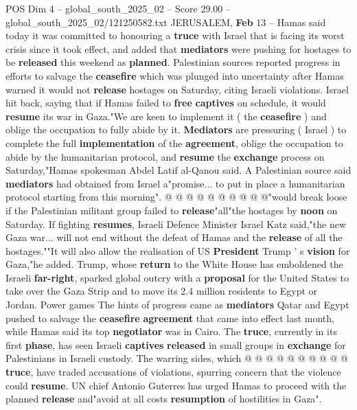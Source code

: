 \begin{textsample}{POS Dim 4 – global\_south\_2025\_02 – Score 29.00 – global\_south\_2025\_02/121250582.txt}  \label{ex:f4_pos_023}
JERUSALEM, \textbf{Feb} 13 -- Hamas said today it was committed to honouring a \textbf{truce} with Israel that is facing its worst crisis since it took effect, and added that \textbf{mediators} were pushing for hostages to be \textbf{released} this weekend as \textbf{planned}.
Palestinian sources reported progress in efforts to salvage the \textbf{ceasefire} which was plunged into uncertainty after Hamas warned it would not \textbf{release} hostages on Saturday, citing Israeli violations.
Israel hit back, saying that if Hamas failed to \textbf{free} \textbf{captives} on schedule, it would \textbf{resume} its war in Gaza."We are keen to implement it ( the \textbf{ceasefire} ) and oblige the occupation to fully abide by it. \textbf{Mediators} are pressuring ( Israel ) to complete the full \textbf{implementation} of the \textbf{agreement}, oblige the occupation to abide by the humanitarian protocol, and \textbf{resume} the \textbf{exchange} process on Saturday,"Hamas spokesman Abdel Latif al-Qanou said.
A Palestinian source said \textbf{mediators} had obtained from Israel a"promise... to put in place a humanitarian protocol starting from this morning". @ @ @ @ @ @ @ @ @ @"would break loose if the Palestinian militant group failed to \textbf{release}"all"the hostages by \textbf{noon} on Saturday.
If fighting \textbf{resumes}, Israeli Defence Minister Israel Katz said,"the new Gaza war... will not end without the defeat of Hamas and the \textbf{release} of all the hostages.""It will also allow the realisation of US \textbf{President} Trump ' s \textbf{vision} for Gaza,"he added.
Trump, whose \textbf{return} to the White House has emboldened the Israeli \textbf{far-right}, sparked global outcry with a \textbf{proposal} for the United States to take over the Gaza Strip and to move its 2.4 million residents to Egypt or Jordan.
Power games The hints of progress came as \textbf{mediators} Qatar and Egypt pushed to salvage the \textbf{ceasefire} \textbf{agreement} that came into effect last month, while Hamas said its top \textbf{negotiator} was in Cairo.
The \textbf{truce}, currently in its first \textbf{phase}, has seen Israeli \textbf{captives} \textbf{released} in small groups in \textbf{exchange} for Palestinians in Israeli custody.
The warring sides, which @ @ @ @ @ @ @ @ @ @ \textbf{truce}, have traded accusations of violations, spurring concern that the violence could \textbf{resume}.
UN chief Antonio Guterres has urged Hamas to proceed with the planned \textbf{release} and"avoid at all costs \textbf{resumption} of hostilities in Gaza".

\end{textsample}
